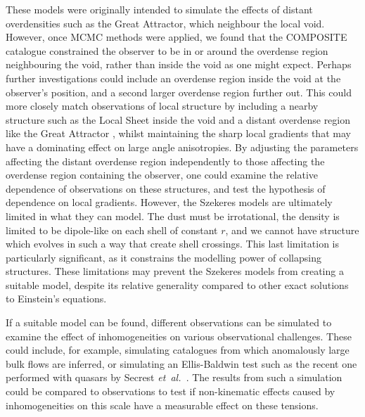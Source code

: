 \documentclass[a4paper,12pt]{report}
\newcommand{\etal}{\emph{et~al.\ }}
\begin{document}
These models were originally intended to simulate the effects of distant overdensities such as the Great Attractor, which neighbour the local void. However, once MCMC methods were applied, we found that the COMPOSITE catalogue constrained the observer to be in or around the overdense region neighbouring the void, rather than inside the void as one might expect. Perhaps further investigations could include an overdense region inside the void at the observer's position, and a second larger overdense region further out. This could more closely match observations of local structure by including a nearby structure such as the Local Sheet \cite{RN74,RN240,RN241} inside the void and a distant overdense region like the Great Attractor \cite{RN168}, whilst maintaining the sharp local gradients that may have a dominating effect on large angle anisotropies. By adjusting the parameters affecting the distant overdense region independently to those affecting the overdense region containing the observer, one could examine the relative dependence of observations on these structures, and test the hypothesis of dependence on local gradients. However, the Szekeres models are ultimately limited in what they can model. The dust must be irrotational, the density is limited to be dipole-like on each shell of constant $r$, and we cannot have structure which evolves in such a way that create shell crossings. This last limitation is particularly significant, as it constrains the modelling power of collapsing structures. These limitations may prevent the Szekeres models from creating a suitable model, despite its relative generality compared to other exact solutions to Einstein's equations.

If a suitable model can be found, different observations can be simulated to examine the effect of inhomogeneities on various observational challenges. These could include, for example, simulating catalogues from which anomalously large bulk flows are inferred, or simulating an Ellis-Baldwin test \cite{RN67} such as the recent one performed with quasars by Secrest \etal \cite{RN31,RN167}. The results from such a simulation could be compared to observations to test if non-kinematic effects caused by inhomogeneities on this scale have a measurable effect on these tensions.

\cleardoublepage
{}
{}
\printbibliography
\end{document}
